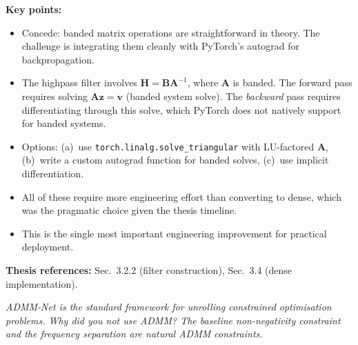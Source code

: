 \documentclass[11pt, letterpaper]{article}
\newcounter{qcounter}
\newcommand{\question}[1]{%
  \stepcounter{qcounter}%
  \begin{questionbox}[Q\theqcounter]%
    \itshape #1%
  \end{questionbox}%
}
\begin{document}
\begin{answerbox}
\textbf{Key points:}
\begin{itemize}[nosep]
  \item Concede: banded matrix operations are straightforward in
        theory.  The challenge is integrating them cleanly with
        PyTorch's autograd for backpropagation.
  \item The highpass filter involves $\mathbf{H} = \mathbf{B}\mathbf{A}^{-1}$,
        where $\mathbf{A}$ is banded.  The forward pass requires
        solving $\mathbf{A}\mathbf{z} = \mathbf{v}$ (banded system solve).
        The \emph{backward} pass requires differentiating through
        this solve, which PyTorch does not natively support for
        banded systems.
  \item Options: (a)~use \texttt{torch.linalg.solve\_triangular}
        with LU-factored $\mathbf{A}$, (b)~write a custom autograd
        function for banded solves, (c)~use implicit differentiation.
  \item All of these require more engineering effort than converting
        to dense, which was the pragmatic choice given the thesis
        timeline.
  \item This is the single most important engineering improvement
        for practical deployment.
\end{itemize}
\textbf{Thesis references:} Sec.~3.2.2 (filter construction), Sec.~3.4 (dense implementation).
\end{answerbox}

\question{ADMM-Net is the standard framework for unrolling constrained
optimisation problems.  Why did you not use ADMM?  The baseline
non-negativity constraint and the frequency separation are natural
ADMM constraints.}
\end{document}
